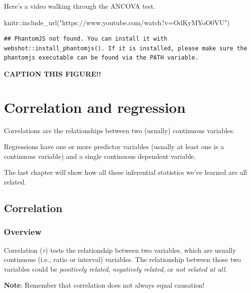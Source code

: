 \documentclass[
]{book}
\newenvironment{Shaded}{\begin{snugshade}}{\end{snugshade}}
\newcommand{\FunctionTok}[1]{\textcolor[rgb]{0.00,0.00,0.00}{#1}}
\newcommand{\NormalTok}[1]{#1}
\newcommand{\SpecialCharTok}[1]{\textcolor[rgb]{0.00,0.00,0.00}{#1}}
\newcommand{\StringTok}[1]{\textcolor[rgb]{0.31,0.60,0.02}{#1}}
\begin{document}
Here's a video walking through the ANCOVA test.

\begin{Shaded}
\begin{Highlighting}[]
\NormalTok{knitr}\SpecialCharTok{::}\FunctionTok{include\_url}\NormalTok{(}\StringTok{"https://www.youtube.com/watch?v=OdKyMYoO0VU"}\NormalTok{)}
\end{Highlighting}
\end{Shaded}

\begin{verbatim}
## PhantomJS not found. You can install it with webshot::install_phantomjs(). If it is installed, please make sure the phantomjs executable can be found via the PATH variable.
\end{verbatim}

\label{fig:unnamed-chunk-1}\textbf{CAPTION THIS FIGURE!!}

\hypertarget{correlation-and-regression}{%
\chapter{Correlation and regression}\label{correlation-and-regression}}

Correlations are the relationships between two (usually) continuous variables.

Regressions have one or more predictor variables (usually at least one is a continuous variable) and a single continuous dependent variable.

The last chapter will show how all these inferential statistics we've learned are all related.

\hypertarget{correlation}{%
\section{Correlation}\label{correlation}}

\hypertarget{overview-10}{%
\subsection{Overview}\label{overview-10}}

Correlation (\emph{r}) tests the relationship between two variables, which are usually continuous (i.e., ratio or interval) variables. The relationship between those two variables could be \emph{positively related}, \emph{negatively related}, or \emph{not related at all}.

\textbf{Note}: Remember that correlation does not always equal causation!
\end{document}
